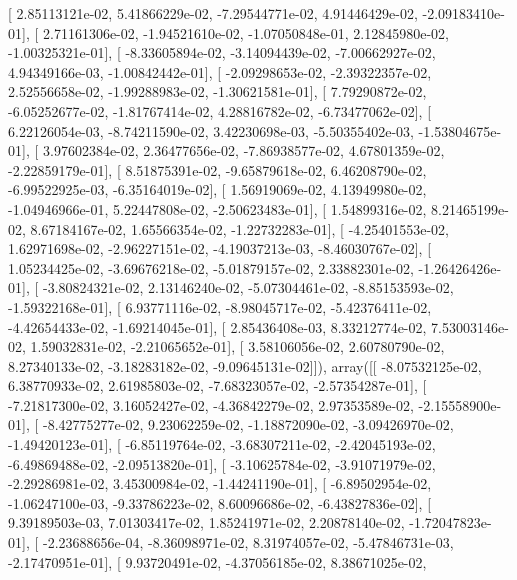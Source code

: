 \documentclass{article}
\begin{document}
       [  2.85113121e-02,   5.41866229e-02,  -7.29544771e-02,
          4.91446429e-02,  -2.09183410e-01],
       [  2.71161306e-02,  -1.94521610e-02,  -1.07050848e-01,
          2.12845980e-02,  -1.00325321e-01],
       [ -8.33605894e-02,  -3.14094439e-02,  -7.00662927e-02,
          4.94349166e-03,  -1.00842442e-01],
       [ -2.09298653e-02,  -2.39322357e-02,   2.52556658e-02,
         -1.99288983e-02,  -1.30621581e-01],
       [  7.79290872e-02,  -6.05252677e-02,  -1.81767414e-02,
          4.28816782e-02,  -6.73477062e-02],
       [  6.22126054e-03,  -8.74211590e-02,   3.42230698e-03,
         -5.50355402e-03,  -1.53804675e-01],
       [  3.97602384e-02,   2.36477656e-02,  -7.86938577e-02,
          4.67801359e-02,  -2.22859179e-01],
       [  8.51875391e-02,  -9.65879618e-02,   6.46208790e-02,
         -6.99522925e-03,  -6.35164019e-02],
       [  1.56919069e-02,   4.13949980e-02,  -1.04946966e-01,
          5.22447808e-02,  -2.50623483e-01],
       [  1.54899316e-02,   8.21465199e-02,   8.67184167e-02,
          1.65566354e-02,  -1.22732283e-01],
       [ -4.25401553e-02,   1.62971698e-02,  -2.96227151e-02,
         -4.19037213e-03,  -8.46030767e-02],
       [  1.05234425e-02,  -3.69676218e-02,  -5.01879157e-02,
          2.33882301e-02,  -1.26426426e-01],
       [ -3.80824321e-02,   2.13146240e-02,  -5.07304461e-02,
         -8.85153593e-02,  -1.59322168e-01],
       [  6.93771116e-02,  -8.98045717e-02,  -5.42376411e-02,
         -4.42654433e-02,  -1.69214045e-01],
       [  2.85436408e-03,   8.33212774e-02,   7.53003146e-02,
          1.59032831e-02,  -2.21065652e-01],
       [  3.58106056e-02,   2.60780790e-02,   8.27340133e-02,
         -3.18283182e-02,  -9.09645131e-02]]), array([[ -8.07532125e-02,   6.38770933e-02,   2.61985803e-02,
         -7.68323057e-02,  -2.57354287e-01],
       [ -7.21817300e-02,   3.16052427e-02,  -4.36842279e-02,
          2.97353589e-02,  -2.15558900e-01],
       [ -8.42775277e-02,   9.23062259e-02,  -1.18872090e-02,
         -3.09426970e-02,  -1.49420123e-01],
       [ -6.85119764e-02,  -3.68307211e-02,  -2.42045193e-02,
         -6.49869488e-02,  -2.09513820e-01],
       [ -3.10625784e-02,  -3.91071979e-02,  -2.29286981e-02,
          3.45300984e-02,  -1.44241190e-01],
       [ -6.89502954e-02,  -1.06247100e-03,  -9.33786223e-02,
          8.60096686e-02,  -6.43827836e-02],
       [  9.39189503e-03,   7.01303417e-02,   1.85241971e-02,
          2.20878140e-02,  -1.72047823e-01],
       [ -2.23688656e-04,  -8.36098971e-02,   8.31974057e-02,
         -5.47846731e-03,  -2.17470951e-01],
       [  9.93720491e-02,  -4.37056185e-02,   8.38671025e-02,
\end{document}
